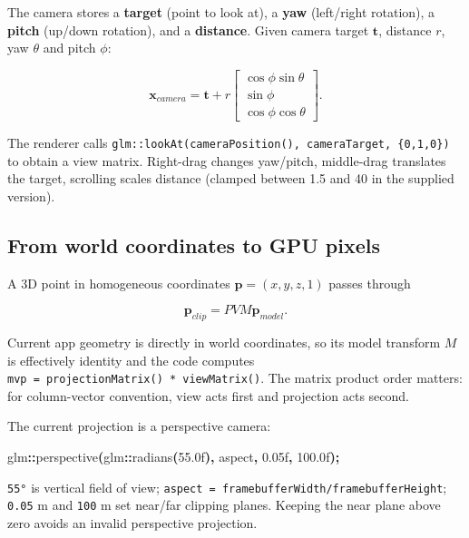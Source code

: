 \documentclass[
  10pt,
  a4paper,
]{article}
\newenvironment{Shaded}{\begin{snugshade}}{\end{snugshade}}
\newcommand{\BuiltInTok}[1]{#1}
\newcommand{\FloatTok}[1]{\textcolor[rgb]{0.00,0.00,0.81}{#1}}
\newcommand{\NormalTok}[1]{#1}
\newcommand{\OperatorTok}[1]{\textcolor[rgb]{0.81,0.36,0.00}{\textbf{#1}}}
\begin{document}
The camera stores a \textbf{target} (point to look at), a \textbf{yaw}
(left/right rotation), a \textbf{pitch} (up/down rotation), and a
\textbf{distance}. Given camera target \(\mathbf t\), distance \(r\),
yaw \(\theta\) and pitch \(\phi\):

\[\mathbf x_{camera}=\mathbf t+r\begin{bmatrix}
\cos\phi\sin\theta\\
\sin\phi\\
\cos\phi\cos\theta
\end{bmatrix}.\]

The renderer calls
\texttt{glm::lookAt(cameraPosition(),\ cameraTarget,\ \{0,1,0\})} to
obtain a view matrix. Right-drag changes yaw/pitch, middle-drag
translates the target, scrolling scales distance (clamped between 1.5
and 40 in the supplied version).

\subsection{From world coordinates to GPU
pixels}\label{from-world-coordinates-to-gpu-pixels}

A 3D point in homogeneous coordinates \(\mathbf p=(x,y,z,1)\) passes
through

\[\boxed{\mathbf p_{clip}=PVM\mathbf p_{model}}.\]

Current app geometry is directly in world coordinates, so its model
transform \(M\) is effectively identity and the code computes
\texttt{mvp\ =\ projectionMatrix()\ *\ viewMatrix()}. The matrix product
order matters: for column-vector convention, view acts first and
projection acts second.

The current projection is a perspective camera:

\begin{Shaded}
\begin{Highlighting}[]
\NormalTok{glm}\OperatorTok{::}\NormalTok{perspective}\OperatorTok{(}\NormalTok{glm}\OperatorTok{::}\NormalTok{radians}\OperatorTok{(}\FloatTok{55.0}\BuiltInTok{f}\OperatorTok{),}\NormalTok{ aspect}\OperatorTok{,} \FloatTok{0.05}\BuiltInTok{f}\OperatorTok{,} \FloatTok{100.0}\BuiltInTok{f}\OperatorTok{);}
\end{Highlighting}
\end{Shaded}

\texttt{55°} is vertical field of view;
\texttt{aspect\ =\ framebufferWidth/framebufferHeight}; \texttt{0.05} m
and \texttt{100} m set near/far clipping planes. Keeping the near plane
above zero avoids an invalid perspective projection.
\end{document}
